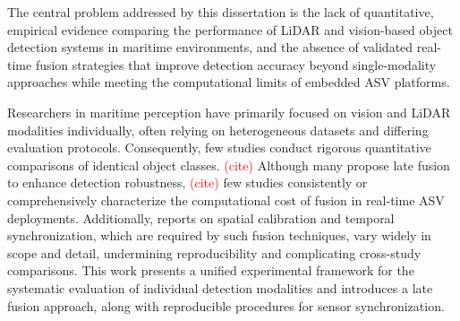 \documentclass{erauthesis}
\begin{document}
The central problem addressed by this dissertation is the lack of quantitative, empirical evidence comparing the performance of \ac{LiDAR} and vision-based object detection systems in maritime environments, and the absence of validated real-time fusion strategies that improve detection accuracy beyond single-modality approaches while meeting the computational limits of embedded \ac{ASV} platforms.

Researchers in maritime perception have primarily focused on vision and \ac{LiDAR} modalities individually, often relying on heterogeneous datasets and differing evaluation protocols. 
Consequently, few studies conduct rigorous quantitative comparisons of identical object classes. \textcolor{red}{(cite)}
Although many propose late fusion to enhance detection robustness, \textcolor{red}{(cite)} few studies consistently or comprehensively characterize the computational cost of fusion in real-time \ac{ASV} deployments.
Additionally, reports on spatial calibration and temporal synchronization, which are required by such fusion techniques, vary widely in scope and detail, undermining reproducibility and complicating cross-study comparisons. 
This work presents a unified experimental framework for the systematic evaluation of individual detection modalities and introduces a late fusion approach, along with reproducible procedures for sensor synchronization.
\end{document}
